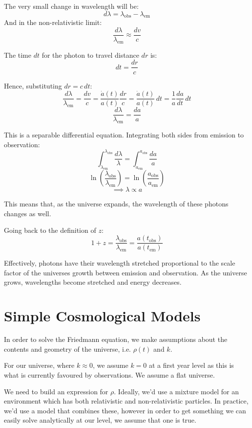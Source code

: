 The very small change in wavelength will be:
\[
    d\lambda = \lambda_\text{obs} - \lambda_\text{em}
\]
And in the non-relativistic limit:
\[
    \frac{d\lambda}{\lambda_\text{em}} \approx \frac{dv}{c}
\]

The time $dt$ for the photon to travel distance $dr$ is:
\[
    dt = \frac{dr}{c}
\]

Hence, substituting $dr = c\, dt$:
\[
    \frac{d\lambda}{\lambda_\text{em}} = \frac{dv}{c} = \frac{\dot{a}(t)}{a(t)} \frac{dr}{c} = \frac{\dot{a}(t)}{a(t)}\, dt = \frac{1}{a}\frac{da}{dt}\, dt
\]
\[
    \frac{d\lambda}{\lambda_\text{em}} = \frac{da}{a}
\]

This is a separable differential equation. Integrating both sides from emission to observation:
\[
    \int_{\lambda_\text{em}}^{\lambda_\text{obs}} \frac{d\lambda}{\lambda} = \int_{a_\text{em}}^{a_\text{obs}} \frac{da}{a}
\]
\[
    \ln\left(\frac{\lambda_\text{obs}}{\lambda_\text{em}}\right) = \ln\left(\frac{a_\text{obs}}{a_\text{em}}\right)
\]
\[
    \implies \boxed{\lambda \propto a}
\]

This means that, as the universe expands, the wavelength of these photons changes as well.

Going back to the definition of $z$:
\[
    1 + z = \frac{\lambda_\text{obs}}{\lambda_\text{em}} = \frac{a(t_\text{obs})}{a(t_\text{em})}
\]

Effectively, photons have their wavelength stretched proportional to the scale factor of the universes growth between emission and observation. As the universe grows, wavelengths become stretched and energy decreases.

\section{Simple Cosmological Models}
In order to solve the Friedmann equation, we make assumptions about the contents and geometry of the universe, i.e. $\rho(t)$ and $k$.

For our universe, where $k \approx 0$, we assume $k = 0$ at a first year level as this is what is currently favoured by observations. We assume a flat universe.

We need to build an expression for $\rho$. Ideally, we'd use a mixture model for an environment which has both relativistic and non-relativistic particles. In practice, we'd use a model that combines these, however in order to get something we can easily solve analytically at our level, we assume that one is true.

